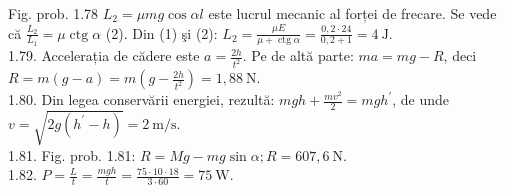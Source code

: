 \documentclass[10pt]{article}
\begin{document}
Fig. prob. 1.78 $L_{2}=\mu m g \cos \alpha l$ este lucrul mecanic al forței de frecare. Se vede că $\frac{L_{2}}{L_{1}}=\mu \operatorname{ctg} \alpha$ (2). Din (1) şi (2): $L_{2}=\frac{\mu E}{\mu+\operatorname{ctg} \alpha}=\frac{0,2 \cdot 24}{0,2+1}=4 \mathrm{~J}$.\\
1.79. Accelerația de cădere este $a=\frac{2 h}{t^{2}}$. Pe de altă parte: $m a=m g-R$, deci $R=m(g-a)=m\left(g-\frac{2 h}{t^{2}}\right)=1,88 \mathrm{~N}$.\\
1.80. Din legea conservării energiei, rezultă: $m g h+\frac{m v^{2}}{2}=m g h^{\prime}$, de unde $v=\sqrt{2 g\left(h^{\prime}-h\right)}=2 \mathrm{~m} / \mathrm{s}$.\\
1.81. Fig. prob. 1.81: $R=M g-m g \sin \alpha ; R=607,6 \mathrm{~N}$.\\
1.82. $P=\frac{L}{t}=\frac{m g h}{t}=\frac{75 \cdot 10 \cdot 18}{3 \cdot 60}=75 \mathrm{~W}$.\\
\end{document}
